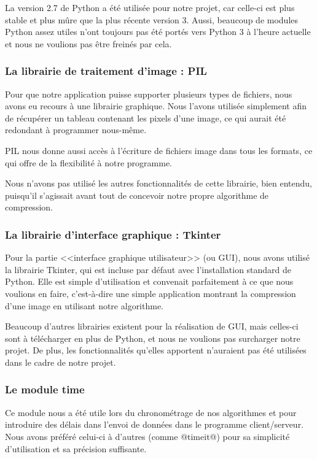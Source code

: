 \documentclass{article}
\begin{document}
La version 2.7 de Python a été utilisée pour notre projet, car celle-ci est plus stable et plus mûre que la plus récente version 3. Aussi, beaucoup de modules Python assez utiles n'ont toujours pas été portés vers Python 3 à l'heure actuelle et nous ne voulions pas être freinés par cela. 

\subsubsection{La librairie de traitement d'image : PIL}

Pour que notre application puisse supporter plusieurs types de fichiers, nous avons eu recours à une librairie graphique. Nous l'avons utilisée simplement afin de récupérer un tableau contenant les pixels d'une image, ce qui aurait été redondant à programmer nous-même.

PIL nous donne aussi accès à l'écriture de fichiers image dans tous les formats, ce qui offre de la flexibilité à notre programme.

Nous n'avons pas utilisé les autres fonctionnalités de cette librairie, bien entendu, puisqu'il s'agissait avant tout de concevoir notre propre algorithme de compression.

\subsubsection{La librairie d'interface graphique : Tkinter}

Pour la partie <<interface graphique utilisateur>> (ou GUI), nous avons utilisé la librairie Tkinter, qui est incluse par défaut avec l'installation standard de Python. Elle est simple d'utilisation et convenait parfaitement à ce que nous voulions en faire, c'est-à-dire une simple application montrant la compression d'une image en utilisant notre algorithme.

Beaucoup d'autres librairies existent pour la réalisation de GUI, mais celles-ci sont à télécharger en plus de Python, et nous ne voulions pas surcharger notre projet. De plus, les fonctionnalités qu'elles apportent n'auraient pas été utilisées dans le cadre de notre projet.

\subsubsection{Le module time}

Ce module nous a été utile lors du chronométrage de nos algorithmes et pour introduire des délais dans l'envoi de données dans le programme client/serveur. Nous avons préféré celui-ci à d'autres (comme @timeit@) pour sa simplicité d'utilisation et sa précision suffisante.
\end{document}
